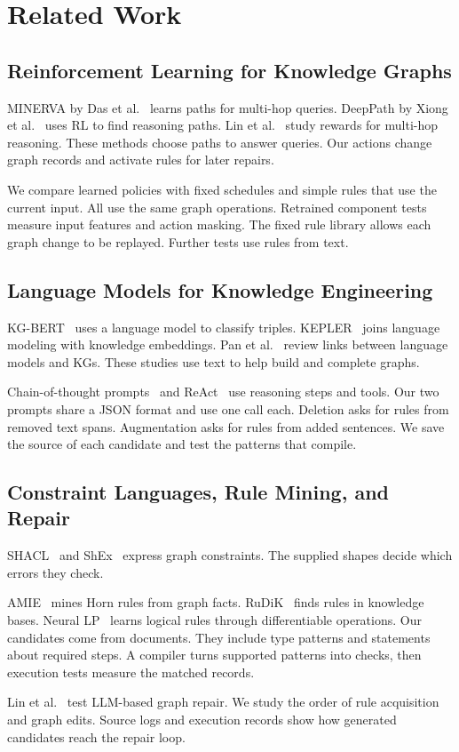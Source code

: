 \section{Related Work}

\label{sec:related_work}

\subsection{Reinforcement Learning for Knowledge Graphs}

MINERVA by Das et al.~\cite{ref_das2018} learns paths for multi-hop queries.
DeepPath by Xiong et al.~\cite{ref_xiong2017} uses RL to find reasoning paths.
Lin et al.~\cite{ref_lin2018} study rewards for multi-hop reasoning.
These methods choose paths to answer queries. Our actions change graph
records and activate rules for later repairs.

We compare learned policies with fixed schedules and simple rules that use
the current input. All use the same graph operations. Retrained component
tests measure input features and action masking. The fixed rule library
allows each graph change to be replayed. Further tests use rules from text.

\subsection{Language Models for Knowledge Engineering}

KG-BERT~\cite{ref_yao2019} uses a language model to classify triples.
KEPLER~\cite{ref_wang2021kepler} joins language modeling with knowledge
embeddings. Pan et al.~\cite{ref_pan2024} review links between language
models and KGs. These studies use text to help build and complete graphs.

Chain-of-thought prompts~\cite{ref_wei2023} and ReAct~\cite{ref_yao2023}
use reasoning steps and tools. Our two prompts share a JSON format and
use one call each. Deletion asks for rules from removed text spans.
Augmentation asks for rules from added sentences. We save the source of
each candidate and test the patterns that compile.

\subsection{Constraint Languages, Rule Mining, and Repair}

SHACL~\cite{ref_knublauch2017} and ShEx~\cite{ref_prud2014} express graph
constraints. The supplied shapes decide which errors they check.

AMIE~\cite{ref_galarraga2013} mines Horn rules from graph facts.
RuDiK~\cite{ref_ortona2018} finds rules in knowledge bases.
Neural LP~\cite{ref_yang2017} learns logical rules through differentiable
operations. Our candidates come from documents. They include type patterns
and statements about required steps. A compiler turns supported patterns
into checks, then execution tests measure the matched records.

Lin et al.~\cite{ref_lin2025} test LLM-based graph repair.
We study the order of rule acquisition and graph edits. Source logs and
execution records show how generated candidates reach the repair loop.
